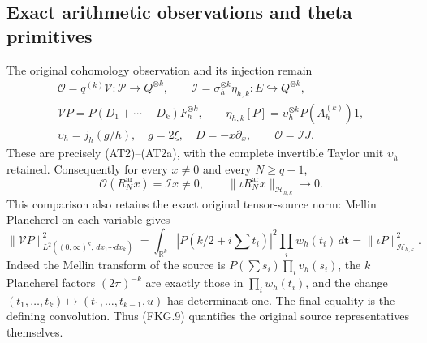 \subsection{Exact arithmetic observations and theta primitives}

The original cohomology observation and its injection remain
\[
 \begin{gathered}
 \mathcal O=q^{(k)}\mathcal V:\mathcal P\longrightarrow Q^{\otimes k},
 \qquad \mathcal I=\sigma_h^{\otimes k}\eta_{h,k}:E\hookrightarrow Q^{\otimes k},\\
 \mathcal VP=P(D_1+\cdots+D_k)F_h^{\otimes k},\qquad
 \eta_{h,k}[P]=\upsilon_h^{\otimes k}P(A_h^{(k)})1,\\
 \upsilon_h=j_h(g/h),\quad g=2\xi,\quad D=-x\partial_x,
 \qquad\mathcal O=\mathcal I J.
 \end{gathered}
 \tag{FKG.8}
\]
These are precisely (AT2)--(AT2a), with the complete invertible
Taylor unit $\upsilon_h$ retained. Consequently for every $x\ne0$
and every $N\geq q-1$,
\[
 \mathcal O(R_N^{\mathrm{ar}}x)=\mathcal I x\ne0,
 \qquad \|\iota R_N^{\mathrm{ar}}x\|_{\mathscr H_{h,k}}\longrightarrow0.
 \tag{FKG.9}
\]
This comparison also retains the exact original tensor-source norm:
Mellin Plancherel on each variable gives
\[
 \|\mathcal VP\|_{L^2((0,\infty)^k,\,dx_1\cdots dx_k)}^2
 =\int_{\mathbb R^k}|P(k/2+i\textstyle\sum t_i)|^2
                         \prod_iw_h(t_i)\,d\mathbf t
 =\|\iota P\|_{\mathscr H_{h,k}}^2.
 \tag{FKG.10}
\]
Indeed the Mellin transform of the source is
$P(\sum s_i)\prod_iv_h(s_i)$, the $k$ Plancherel factors
$(2\pi)^{-k}$ are exactly those in $\prod_iw_h(t_i)$, and
the change $(t_1,\ldots,t_k)\mapsto(t_1,\ldots,t_{k-1},u)$
has determinant one. The final equality is the defining convolution.
Thus (FKG.9) quantifies the original source representatives themselves.

